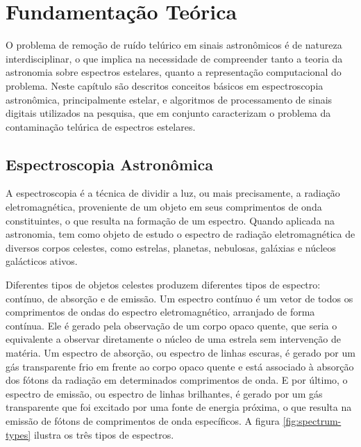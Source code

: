\chapter{Fundamentação Teórica}
\label{cap:fundamentacao-teorica}

O problema de remoção de ruído telúrico em sinais astronômicos é de natureza interdisciplinar, o que implica na necessidade de compreender tanto a teoria da astronomia sobre espectros estelares, quanto a representação computacional do problema.
Neste capítulo são descritos conceitos básicos em espectroscopia astronômica, principalmente estelar, e algoritmos de processamento de sinais digitais utilizados na pesquisa, que em conjunto caracterizam o problema da contaminação telúrica de espectros estelares.

\section{Espectroscopia Astronômica} \label{astronomic-spectroscopy}

A espectroscopia é a técnica de dividir a luz, ou mais precisamente, a radiação eletromagnética, proveniente de um objeto em seus comprimentos de onda constituintes, o que resulta na formação de um espectro. Quando aplicada na astronomia, tem como objeto de estudo o espectro de radiação eletromagnética de diversos corpos celestes, como estrelas, planetas, nebulosas, galáxias e núcleos galácticos ativos.

Diferentes tipos de objetos celestes produzem diferentes tipos de espectro:  contínuo, de absorção e de emissão. Um espectro contínuo é um vetor de todos os comprimentos de ondas do espectro eletromagnético, arranjado de forma contínua. Ele é gerado pela observação de um corpo opaco quente, que seria o equivalente a observar diretamente o núcleo de uma estrela sem intervenção de matéria. Um espectro de absorção, ou espectro de linhas escuras, é gerado por um gás transparente frio em frente ao corpo opaco quente e está associado à absorção dos fótons da radiação em determinados comprimentos de onda. E por último, o espectro de emissão, ou espectro de linhas brilhantes, é gerado por um gás transparente que foi excitado por uma fonte de energia próxima, o que resulta na emissão de fótons de comprimentos de onda específicos. A figura \ref{fig:spectrum-types} ilustra os três tipos de espectros. 


